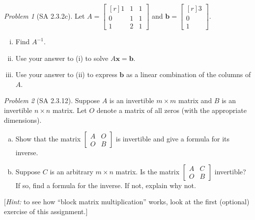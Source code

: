 \documentclass[fleqn,11pt]{paper}
\theoremstyle{remark}
\newtheorem{problem}{Problem}
\newtheorem*{solution}{{\bf Solution}}
\renewcommand{\vec}[1]{\mathbf{#1}}
\newcommand{\<}{\ensuremath{\langle}}
\renewcommand{\>}{\ensuremath{\rangle}}
\newcommand\vb{\vec{b}}
\newcommand\vx{\vec{x}}
\begin{document}
\begin{problem}[SA 2.3.2c]
  Let
  $A = \begin{bmatrix*}[r] 1&1&1\\0&1&1\\1&2&1\end{bmatrix*}$ 
    and 
    $\vb = \begin{bmatrix*}[r] 3\\0\\1\end{bmatrix*}$.
      \begin{enumerate}[(i)]
      \item Find $A^{-1}$.
      \item Use your answer to (i) to solve $A\vx = \vb$.
      \item Use your answer to (ii) to express $\vb$ as a linear combination of the columns of $A$.
      \end{enumerate}
\end{problem}
\newpage


\begin{problem}[SA 2.3.12]
  Suppose $A$ is an invertible $m \times m$ matrix and $B$ is an invertible 
  $n \times n$ matrix. Let $O$ denote a matrix of all zeros (with the appropriate
  dimensions).
 \begin{enumerate}[a.]
  \item 
    Show that the matrix
    $\left[ 
      \begin{array}{c|c}
        A &O \\ 
        \hline
        O &B
      \end{array}
      \right]$
    is invertible and give a formula for its inverse.

  \item Suppose $C$ is an arbitrary $m \times n$ matrix. Is the matrix
    $\left[ 
    \begin{array}{c|c}
      A &C \\ 
      \hline
      O &B
    \end{array}
    \right]$
    invertible? If so, find a formula for the inverse.  If not, explain why not.
  \end{enumerate}
  [{\it Hint:} to see how ``block matrix multiplication'' works,
    look at the first (optional) exercise of this assignment.]
 
\end{problem}
\newpage
\end{document}
